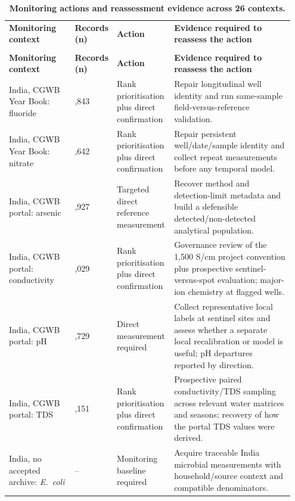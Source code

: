 \documentclass[10pt,letterpaper]{article}
\newlength\savedwidth
\newcommand\thickhline{\noalign{\global\savedwidth\arrayrulewidth\global\arrayrulewidth 2pt}%
\hline
\noalign{\global\arrayrulewidth\savedwidth}}
\begin{document}
{\footnotesize\setlength{\tabcolsep}{3pt}\setlength{\LTcapwidth}{\linewidth}
\begin{longtable}{>{\raggedright\arraybackslash}p{0.2385\linewidth}>{\raggedleft\arraybackslash}p{0.0769\linewidth}>{\raggedright\arraybackslash}p{0.2077\linewidth}>{\raggedright\arraybackslash}p{0.4262\linewidth}}
\caption{\textbf{Monitoring actions and reassessment evidence across 26 contexts.}}\label{table1} \\
\hline
\textbf{Monitoring context} & \textbf{Records (n)} & \textbf{Action} & \textbf{Evidence required to reassess the action} \\ \thickhline
\endfirsthead
\multicolumn{4}{@{}l}{\footnotesize\emph{Table 1. (continued)}} \\
\hline
\textbf{Monitoring context} & \textbf{Records (n)} & \textbf{Action} & \textbf{Evidence required to reassess the action} \\ \thickhline
\endhead
India, CGWB Year Book: fluoride & 35,843 & Rank prioritisation plus direct confirmation & Repair longitudinal well identity and run same-sample field-versus-reference validation. \\ \hline
India, CGWB Year Book: nitrate & 34,642 & Rank prioritisation plus direct confirmation & Repair persistent well/date/sample identity and collect repeat measurements before any temporal model. \\ \hline
India, CGWB portal: arsenic & 9,927 & Targeted direct reference measurement & Recover method and detection-limit metadata and build a defensible detected/non-detected analytical population. \\ \hline
India, CGWB portal: conductivity & 173,029 & Rank prioritisation plus direct confirmation & Governance review of the 1,500 \textmu{}S/cm project convention plus prospective sentinel-versus-spot evaluation; major-ion chemistry at flagged wells. \\ \hline
India, CGWB portal: pH & 162,729 & Direct measurement required & Collect representative local labels at sentinel sites and assess whether a separate local recalibration or model is useful; pH departures reported by direction. \\ \hline
India, CGWB portal: TDS & 30,151 & Rank prioritisation plus direct confirmation & Prospective paired conductivity/TDS sampling across relevant water matrices and seasons; recovery of how the portal TDS values were derived. \\ \hline
India, no accepted archive: \textit{E.~coli} & -- & Monitoring baseline required & Acquire traceable India microbial measurements with household/source context and compatible denominators. \\ \hline

\end{longtable}}
\end{document}
